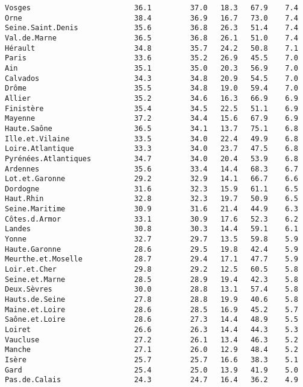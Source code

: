 \documentclass[11pt,a4paper]{article}\usepackage[]{graphicx}\usepackage[]{color}
\makeatletter
\newenvironment{kframe}{%
 \def\at@end@of@kframe{}%
 \ifinner\ifhmode%
  \def\at@end@of@kframe{\end{minipage}}%
  \begin{minipage}{\columnwidth}%
 \fi\fi%
 \def\FrameCommand##1{\hskip\@totalleftmargin \hskip-\fboxsep
 \colorbox{shadecolor}{##1}\hskip-\fboxsep
     \hskip-\linewidth \hskip-\@totalleftmargin \hskip\columnwidth}%
 \MakeFramed {\advance\hsize-\width
   \@totalleftmargin\z@ \linewidth\hsize
   \@setminipage}}%
 {\par\unskip\endMakeFramed%
 \at@end@of@kframe}
\newenvironment{knitrout}{}{} %
\makeatother
\begin{document}
\begin{knitrout}
\begin{kframe}
\begin{verbatim}
Vosges                        36.1         37.0   18.3   67.9    7.4
Orne                          38.4         36.9   16.7   73.0    7.4
Seine.Saint.Denis             35.6         36.8   26.3   51.4    7.4
Val.de.Marne                  36.5         36.8   26.1   51.0    7.4
Hérault                       34.8         35.7   24.2   50.8    7.1
Paris                         33.6         35.2   26.9   45.5    7.0
Ain                           35.1         35.0   20.3   56.9    7.0
Calvados                      34.3         34.8   20.9   54.5    7.0
Drôme                         35.5         34.8   19.0   59.4    7.0
Allier                        35.2         34.6   16.3   66.9    6.9
Finistère                     35.4         34.5   22.5   51.1    6.9
Mayenne                       37.2         34.4   15.6   67.9    6.9
Haute.Saône                   36.5         34.1   13.7   75.1    6.8
Ille.et.Vilaine               33.5         34.0   22.4   49.9    6.8
Loire.Atlantique              33.3         34.0   23.7   47.5    6.8
Pyrénées.Atlantiques          34.7         34.0   20.4   53.9    6.8
Ardennes                      35.6         33.4   14.4   68.3    6.7
Lot.et.Garonne                29.2         32.9   14.1   66.7    6.6
Dordogne                      31.6         32.3   15.9   61.1    6.5
Haut.Rhin                     32.8         32.3   19.7   50.9    6.5
Seine.Maritime                30.9         31.6   21.4   44.9    6.3
Côtes.d.Armor                 33.1         30.9   17.6   52.3    6.2
Landes                        30.8         30.3   14.4   59.1    6.1
Yonne                         32.7         29.7   13.5   59.8    5.9
Haute.Garonne                 28.6         29.5   19.8   42.4    5.9
Meurthe.et.Moselle            28.7         29.4   17.1   47.7    5.9
Loir.et.Cher                  29.8         29.2   12.5   60.5    5.8
Seine.et.Marne                28.5         28.9   19.4   42.3    5.8
Deux.Sèvres                   30.0         28.8   13.1   57.4    5.8
Hauts.de.Seine                27.8         28.8   19.9   40.6    5.8
Maine.et.Loire                28.6         28.5   16.9   45.2    5.7
Saône.et.Loire                28.6         27.3   14.4   48.9    5.5
Loiret                        26.6         26.3   14.4   44.3    5.3
Vaucluse                      27.2         26.1   13.4   46.3    5.2
Manche                        27.1         26.0   12.9   48.4    5.2
Isère                         25.7         25.7   16.6   38.3    5.1
Gard                          25.4         25.0   13.9   41.9    5.0
Pas.de.Calais                 24.3         24.7   16.4   36.2    4.9

\end{verbatim}
\end{kframe}
\end{knitrout}
\end{document}
